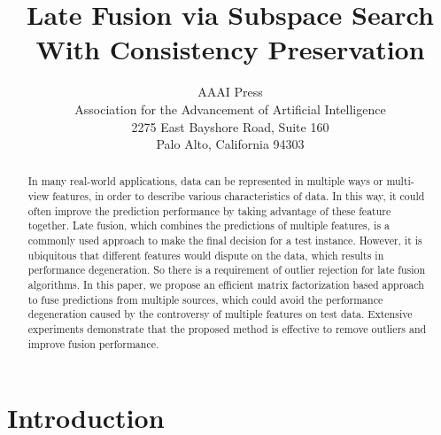 \documentclass[letterpaper]{article}
\begin{document}
%



\title{Late Fusion via Subspace Search With Consistency Preservation}

\author{AAAI Press\\
Association for the Advancement of Artificial Intelligence\\
2275 East Bayshore Road, Suite 160\\
Palo Alto, California 94303\\
}

\maketitle



\begin{abstract}
In many real-world applications, data can be represented in multiple ways or multi-view features,
in order to describe various characteristics of data.
In this way, it could often improve the prediction performance by taking advantage of these feature together.
Late fusion, which combines the predictions of multiple features, is a commonly used approach to make the final decision for a test instance.
However, it is ubiquitous that different features would dispute on the data, which results in performance degeneration.
So there is a requirement of outlier rejection for late fusion algorithms.
In this paper, we propose an efficient matrix factorization based approach to fuse predictions from multiple sources,
which could avoid the performance degeneration caused by the controversy of multiple features on test data.
Extensive experiments demonstrate that the proposed method is effective to remove outliers and improve fusion performance.

\end{abstract}




\section{Introduction}
\end{document}
